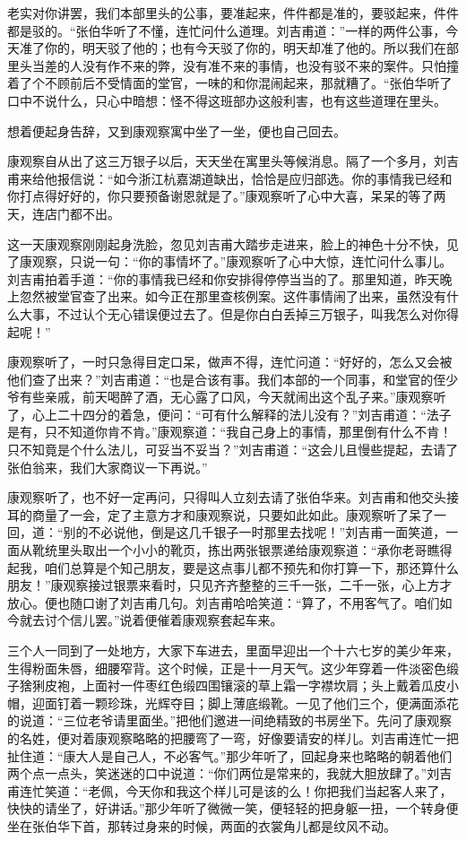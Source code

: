 \documentclass[12pt,UTF8]{ctexbook}
\begin{document}
{{{老实对你讲罢，我们本部里头的公事，要准起来，件件都是准的，要驳起来，件件都是驳的。“张伯华听了不懂，连忙问什么道理。刘吉甫道：”一样的两件公事，今天准了你的，明天驳了他的；也有今天驳了你的，明天却准了他的。所以我们在部里头当差的人没有作不来的弊，没有准不来的事情，也没有驳不来的案件。只怕撞着了个不顾前后不受情面的堂官，一味的和你混闹起来，那就糟了。“张伯华听了口中不说什么，只心中暗想：怪不得这班部办这般利害，也有这些道理在里头。

想着便起身告辞，又到康观察寓中坐了一坐，便也自己回去。

康观察自从出了这三万银子以后，天天坐在寓里头等候消息。隔了一个多月，刘吉甫来给他报信说：“如今浙江杭嘉湖道缺出，恰恰是应归部选。你的事情我已经和你打点得好好的，你只要预备谢恩就是了。”康观察听了心中大喜，呆呆的等了两天，连店门都不出。

这一天康观察刚刚起身洗脸，忽见刘吉甫大踏步走进来，脸上的神色十分不快，见了康观察，只说一句：“你的事情坏了。”康观察听了心中大惊，连忙问什么事儿。刘吉甫拍着手道：“你的事情我已经和你安排得停停当当的了。那里知道，昨天晚上忽然被堂官查了出来。如今正在那里查核例案。这件事情闹了出来，虽然没有什么大事，不过认个无心错误便过去了。但是你白白丢掉三万银子，叫我怎么对你得起呢！”

康观察听了，一时只急得目定口呆，做声不得，连忙问道：“好好的，怎么又会被他们查了出来？”刘吉甫道：“也是合该有事。我们本部的一个同事，和堂官的侄少爷有些亲戚，前天喝醉了酒，无心露了口风，今天就闹出这个乱子来。”康观察听了，心上二十四分的着急，便问：“可有什么解释的法儿没有？”刘吉甫道：“法子是有，只不知道你肯不肯。”康观察道：“我自己身上的事情，那里倒有什么不肯！只不知竟是个什么法儿，可妥当不妥当？”刘吉甫道：“这会儿且慢些提起，去请了张伯翁来，我们大家商议一下再说。”

康观察听了，也不好一定再问，只得叫人立刻去请了张伯华来。刘吉甫和他交头接耳的商量了一会，定了主意方才和康观察说，只要如此如此。康观察听了呆了一回，道：“别的不必说他，倒是这几千银子一时那里去找呢！”刘吉甫一面笑道，一面从靴统里头取出一个小小的靴页，拣出两张银票递给康观察道：“承你老哥瞧得起我，咱们总算是个知己朋友，要是这点事儿都不预先和你打算一下，那还算什么朋友！”康观察接过银票来看时，只见齐齐整整的三千一张，二千一张，心上方才放心。便也随口谢了刘吉甫几句。刘吉甫哈哈笑道：“算了，不用客气了。咱们如今就去讨个信儿罢。”说着便催着康观察套起车来。

三个人一同到了一处地方，大家下车进去，里面早迎出一个十六七岁的美少年来，生得粉面朱唇，细腰窄背。这个时候，正是十一月天气。这少年穿着一件淡密色缎子猞猁皮袍，上面衬一件枣红色缎四围镶滚的草上霜一字襟坎肩；头上戴着瓜皮小帽，迎面钉着一颗珍珠，光辉夺目；脚上薄底缎靴。一见了他们三个，便满面添花的说道：“三位老爷请里面坐。”把他们邀进一间绝精致的书房坐下。先问了康观察的名姓，便对着康观察略略的把腰弯了一弯，好像要请安的样儿。刘吉甫连忙一把扯住道：“康大人是自己人，不必客气。”那少年听了，回起身来也略略的朝着他们两个点一点头，笑迷迷的口中说道：“你们两位是常来的，我就大胆放肆了。”刘吉甫连忙笑道：“老佩，今天你和我这个样儿可是该的么！你把我们当起客人来了，快快的请坐了，好讲话。”那少年听了微微一笑，便轻轻的把身躯一扭，一个转身便坐在张伯华下首，那转过身来的时候，两面的衣裳角儿都是纹风不动。

}}}
\end{document}

